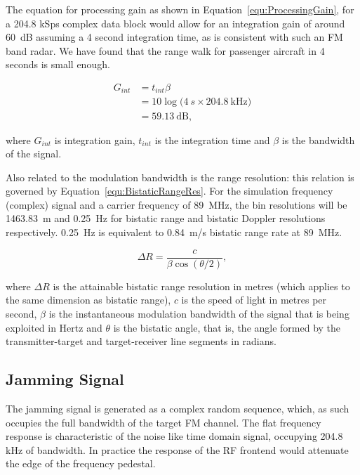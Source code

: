 \documentclass[conference]{IEEEtran}
\begin{document}
The equation for processing gain as shown in Equation~\ref{equ:ProcessingGain}, for a 204.8 kSps complex data block would allow for an integration gain of around 60~dB assuming a 4 second integration time, as is consistent with such an FM band radar. We have found that the range walk for passenger aircraft in 4 seconds is small enough.

\begin{align}\label{equ:ProcessingGain}
G_{int} & = t_{int}  \beta\\
	    & = 10 \log{\bigg(4~s  \times 204.8~\mathrm{kHz}\bigg)}\\
	    & = 59.13~\mathrm{dB} ,
\end{align}

where $G_{int}$ is integration gain, $t_{int}$ is the integration time and $\beta$ is the bandwidth of the signal.

Also related to the modulation bandwidth is the range resolution: this relation is governed by Equation~\ref{equ:BistaticRangeRes}. For the simulation frequency (complex) signal and a carrier frequency of 89~MHz, the bin resolutions will be 1463.83~m and 0.25~Hz for bistatic range and bistatic Doppler resolutions respectively. 0.25~Hz is equivalent to 0.84~m/s bistatic range rate at 89~MHz.

\begin{equation}\label{equ:BistaticRangeRes}
\Delta R = \frac{c}{\beta \cos{  (\theta / 2 )}} ,
\end{equation}

where $\Delta R$ is the attainable bistatic range resolution in metres (which applies to the same dimension as bistatic range), $c$ is the speed of light in metres per second, $\beta$ is the instantaneous modulation bandwidth of the signal that is being exploited in Hertz and $\theta$ is the bistatic angle, that is, the angle formed by the transmitter-target and target-receiver line segments in radians. 


\subsection{Jamming Signal}

The jamming signal is generated as a complex  random sequence, which, as such occupies the full bandwidth of the target FM channel.  The flat frequency response is characteristic of the noise like time domain signal, occupying 204.8 kHz of bandwidth. In practice the response of the RF frontend would attenuate the edge of the frequency pedestal.
\end{document}

